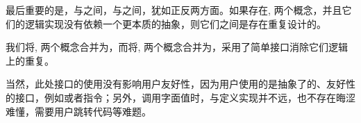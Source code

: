 \begin{content}
最后重要的是，与之间，与之间，犹如正反两方面。如果存在, 两个概念，并且它们的逻辑实现没有依赖一个更本质的抽象，则它们之间是存在重复设计的。

我们将, 两个概念合并为，而将, 两个概念合并为，采用了简单接口消除它们逻辑上的重复。

当然，此处接口的使用没有影响用户友好性，因为用户使用的是抽象了的、友好性的接口，例如或者指令；另外，调用字面值时，与定义实现并不远，也不存在晦涩难懂，需要用户跳转代码等难题。

\end{content}
